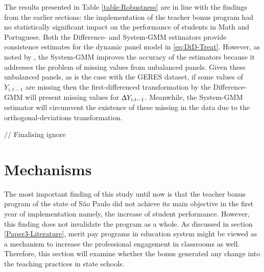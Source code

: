 \documentclass[a4paper, 12pt]{article}
\begin{document}
{The results presented in Table \ref{table:Robustness} are in line with the findings from the earlier sections: the implementation of the teacher bonus program had no statistically significant impact on the performance of students in Math and Portuguese. Both the Difference- and System-GMM estimators provide consistence estimates for the dynamic panel model in \eqref{eq:DiD-Treat}. However, as noted by \citet{roodman2009xtabond2}, the System-GMM improves the accuracy of the estimators because it addresses the problem of missing values from unbalanced panels. Given these unbalanced panels, as is the case with the GERES dataset, if some values of $Y_{i,t-1}$ are missing then the first-differenced transformation by the Difference-GMM will present missing values for $\Updelta Y_{i,t-1}$. Meanwhile, the \citet{blundell1998initial} System-GMM estimator will circumvent the existence of these missing in the data due to the orthogonal-deviations transformation. 




// Finalising ignore
} 
 
 




\section{Mechanisms} \label{Paper3-Mechanisms}


The most important finding of this study until now is that the teacher bonus program of the state of São Paulo did not achieve its main objective in the first year of implementation \textemdash namely, the increase of student performance. However, this finding does not invalidate the program as a whole. As discussed in section \ref{Paper3-Literature}, merit pay programs in education system might be viewed as a mechanism to increase the professional engagement in classrooms as well. Therefore, this section will examine whether the bonus generated any change into the teaching practices in state schools.
\end{document}
